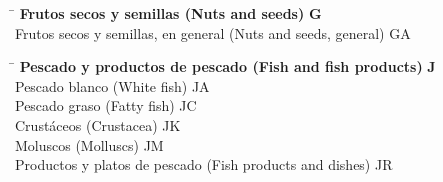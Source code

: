 \begin{small}
    \vspace{-1.25cm}
    
    \begin{tabbing}
    \hspace{15cm} \= \hspace{0cm} \kill
        \textbf{Frutos secos y semillas (Nuts and seeds)} \> \textbf{G} \\
            \hspace{0.5cm}Frutos secos y semillas, en general (Nuts and seeds, general) \> GA \\
    \end{tabbing}
    
    \vspace{-1.25cm}

    \begin{tabbing}
    \hspace{15cm} \= \hspace{0cm} \kill
        \textbf{Pescado y productos de pescado (Fish and fish products)} \> \textbf{J} \\
            \hspace{0.5cm}Pescado blanco (White fish) \> JA \\
            \hspace{0.5cm}Pescado graso (Fatty fish) \> JC \\
            \hspace{0.5cm}Crustáceos (Crustacea) \> JK \\
            \hspace{0.5cm}Moluscos (Molluscs) \> JM \\
            \hspace{0.5cm}Productos y platos de pescado (Fish products and dishes) \> JR \\
    \end{tabbing}

    \vspace{-1.25cm}
    

\end{small}
